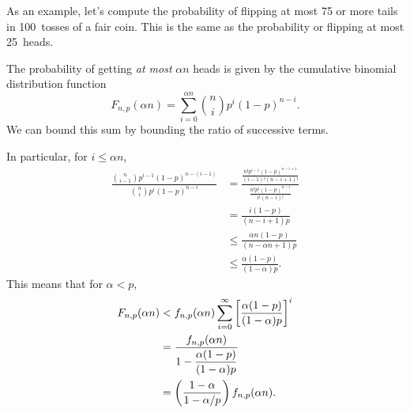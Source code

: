 As an example, let's compute the probability of flipping at most 75 or
more tails in 100~tosses of a fair coin.  This is the same as the
probability or flipping at most 25~heads.

The probability of getting \emph{at most} $\alpha n$ heads is given by
the cumulative binomial distribution function
\begin{equation}\label{LN12:Jsum}
F_{n, p}(\alpha n)
    = \sum_{i = 0}^{\alpha n} \binom{n}{i} p^i (1 - p)^{n - i}.
\end{equation}
We can bound this sum by bounding the ratio of successive terms.

In particular, for $i \le \alpha n$,
\begingroup
{}
\begin{align*}
\frac{ \displaystyle \binom{n}{i - 1} p^{i - 1} (1 - p)^{n - (i - 1)} }
     { \displaystyle \binom{n}{i}     p^i       (1 - p)^{n - i} }
    &=    \frac{\displaystyle
                  \frac{ n! p^{i - 1} (1 - p)^{n - i + 1} }
                       { (i - 1)! (n - i + 1) ! }
              }
              {\displaystyle
                  \frac{ n! p^i (1 - p)^{n - i} }
                       { i! (n - i)! }
              } \\
    &=    \frac{ i (1 - p) }{ (n - i + 1) p } \\
    &\le  \frac{ \alpha n (1 - p) }{ (n - \alpha n + 1) p } \\
    &\le  \frac{ \alpha (1 - p) }{ (1 - \alpha) p }.
\end{align*}
\endgroup
This means that for $\alpha < p$,
\begingroup
{}
\begin{align}
F_{n, p}(\alpha n)
    &<  f_{n, p}(\alpha n)
        \sum_{i = 0}^\infty \left[ \frac{\alpha(1 - p)}{(1 - \alpha)p}\right]^i
\notag \\
    &= \frac{\displaystyle f_{n, p}(\alpha n)}
            {\displaystyle 1 - \frac{\alpha (1 - p)}{(1 - \alpha)p}}
            \notag\\
    &= \left( \frac{1 - \alpha}{1 - \alpha/p} \right) f_{n, p}(\alpha n).
\end{align}
\endgroup


